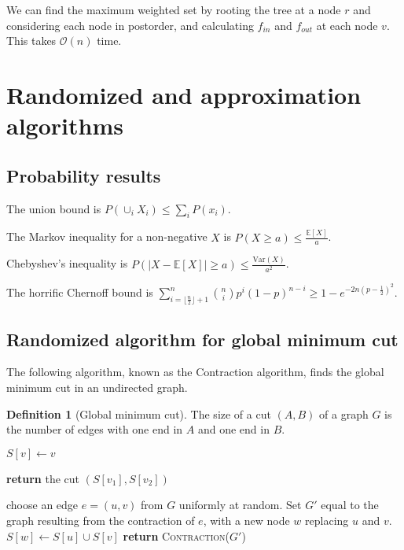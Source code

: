 \documentclass[10pt, oneside, reqno]{amsart}
\theoremstyle{plain}%
\theoremstyle{definition}
\newtheorem{defn}[thm]{Definition}
\theoremstyle{remark}
\newcommand{\expc}[1]{\mathbb{E}\left[#1\right]}
\newcommand{\bigo}[1]{\mathcal{O}(#1)}
\begin{document}
We can find the maximum weighted set by rooting the tree at a node $r$ and considering each node in postorder, and calculating $f_{in}$ and $f_{out}$ at each node $v$. This takes $\bigo{n}$ time.




\section{Randomized and approximation algorithms} %
\label{sec:probabilistic_algorithms}

\subsection{Probability results} %
The union bound is $P(\cup_i X_i) \leq \sum_i P(x_i)$.

The Markov inequality for a non-negative $X$ is $P(X \geq a) \leq \frac{\expc X}{a}$.

Chebyshev's inequality is $P(\left | X - \expc X \right | \geq a) \leq \frac {\textrm{Var}(X)}{a^2}$.

The horrific Chernoff bound is $\sum\limits_{i = \lfloor \frac{n}{2} \rfloor + 1}^n \binom{n}{i}p^i (1 - p)^{n - i} \geq  1-e^{- 2n \left( {p - \frac{1}{2}} \right)^2}$.

\subsection{Randomized algorithm for global minimum cut} %
\label{sub:probabilistic_algorithm_for_global_minimum_cut}
The following algorithm, known as the Contraction algorithm, finds the global minimum cut in an undirected graph.

\begin{defn}[Global minimum cut]
    The size of a cut $(A,B)$ of a graph $G$ is the number of edges with one end in $A$ and one end in $B$.
\end{defn}


\begin{algorithm}[H]
    \label{alg:dynamic_rising_trend}
    \caption{The Contraction algorithm for finding the global minimum cut}
    \begin{algorithmic}[1]
         $S[v] \gets v$ \EndFor
        
         \textbf{return} the cut $(S[v_1], S[v_2])$
        
        \Else
            \State choose an edge $e = (u,v)$ from $G$ uniformly at random.
            \State Set $G'$ equal to the graph resulting from the contraction of $e$, with a new node $w$ replacing $u$ and $v$.
            \State $S[w] \gets S[u] \cup S[v]$ 
            \State \textbf{return} \textsc{Contraction}($G'$)
        \EndIf
    \EndProcedure
    \end{algorithmic}
\end{algorithm}
\end{document}
